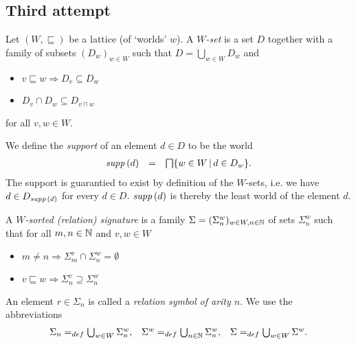 \documentclass[12pt,a4paper]{report}
\begin{document}

\pagebreak
\subsection{Third attempt}

\newcommand{\CExp}{\nstyle{CExp}}
\newcommand{\CVal}{\nstyle{CVal}}
\newcommand{\loc}{\nstyle{loc}}
\newcommand{\sto}{\nstyle{sto}}
\newcommand{\val}{\nstyle{val}}
\newcommand{\DEF}{\nstyle{DEF}}
\newcommand{\OUT}{\nstyle{OUT}}
\newcommand{\I}{\mathcal{I}}

\begin{definition}
  Let $(W,\sqsubseteq)$ be a lattice (of `worlds' $w$).
  A {\em $W$-set} is a set $D$ together with a family of subsets $(D_w)_{w\in W}$ such that
  $D = \bigcup_{w\in W} D_w$ and
  \begin{itemize}
    \item $v \sqsubseteq w \Rightarrow D_v \subseteq D_w$
    \item $D_v \cap D_w \subseteq D_{v \sqcap w}$
  \end{itemize}
  for all $v,w \in W$.
\end{definition}

We define the {\em support} of an element $d\in D$ to be the world
\[\begin{array}{rcl}
  \mathit{supp}\,(d) &=& \bigsqcap \{w\in W\,|\,d \in D_w\}.
\end{array}\]
The support is guarantied to exist by definition of the $W$-sets, i.e. we have
$d \in D_{\mathit{supp}\,(d)}$ for every $d \in D$. $\mathit{supp}\,(d)$ is thereby the least world of the element $d$.

\begin{definition}
  A {\em $W$-sorted (relation) signature} is a family $\Sigma=(\Sigma^w_n)_{w\in W,n\in \mathbb N}$
  of sets $\Sigma^w_n$ such that for all $m,n\in \mathbb N$ and $v,w\in W$
  \begin{itemize}
    \item $m \ne n \Rightarrow \Sigma^v_m \cap \Sigma^w_n = \emptyset$
    \item $v \sqsubseteq w \Rightarrow \Sigma^v_n \supseteq \Sigma^w_n$
  \end{itemize}
\end{definition}

An element $r \in \Sigma_n$ is called a {\em relation symbol of arity $n$}. We use the abbreviations
\[\begin{array}{rcl}
  \Sigma_n =_{def} \bigcup_{w\in W} \Sigma^w_n, &
  \Sigma^w =_{def} \bigcup_{n\in \mathbb N} \Sigma^w_n, &
  \Sigma =_{def} \bigcup_{w\in W} \Sigma^w.
\end{array}\]
\end{document}

